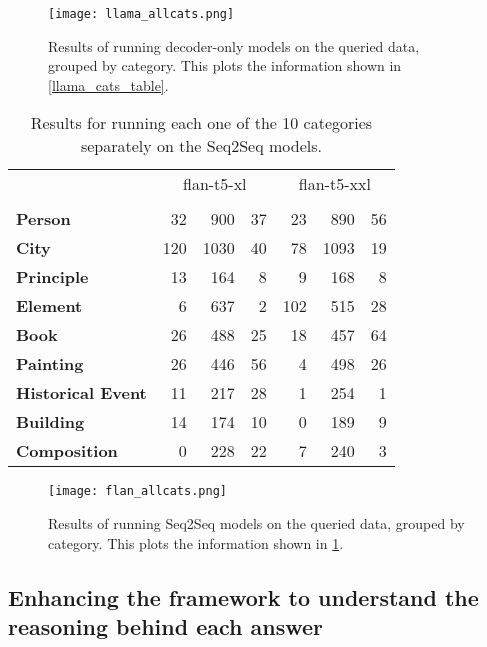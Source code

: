 \begin{figure}[p]
	\centering
	\texttt{[image: llama\_allcats.png]}
	\caption{Results of running decoder-only models on the queried data, grouped by category. This plots the information shown in \cref{llama_cats_table}.}
	\label{llama_cats_result}
\end{figure}

\begin{table}[ht]
	\centering
	\footnotesize
	\begin{tabular}{>{\bfseries}l | r r r | r r r}
		\toprule
			& \multicolumn{3}{|c}{\ttfamily flan-t5-xl} & \multicolumn{3}{|c}{\ttfamily flan-t5-xxl} \\
			& \Parametric{} & \Contextual{} & \Other{} & \Parametric{} & \Contextual{} & \Other{} \\
		\midrule
			Person           &  32 &  900 & 37 &  23 &  890 & 56 \\
			City             & 120 & 1030 & 40 &  78 & 1093 & 19 \\
			Principle        &  13 &  164 &  8 &   9 &  168 &  8 \\
			Element          &   6 &  637 &  2 & 102 &  515 & 28 \\
			Book             &  26 &  488 & 25 &  18 &  457 & 64 \\
			Painting         &  26 &  446 & 56 &   4 &  498 & 26 \\
			Historical Event &  11 &  217 & 28 &   1 &  254 &  1 \\
			Building         &  14 &  174 & 10 &   0 &  189 &  9 \\
			Composition      &   0 &  228 & 22 &   7 &  240 &  3 \\
		\bottomrule
	\end{tabular}
	\caption{Results for running each one of the 10 categories separately on the Seq2Seq models.}
	\label{flan_cats_table}
\end{table}

\begin{figure}[p]
	\centering
	\texttt{[image: flan\_allcats.png]}
	\caption{Results of running Seq2Seq models on the queried data, grouped by category. This plots the information shown in \cref{flan_cats_table}.}
	\label{flan_cats_result}
\end{figure}


\subsection{Enhancing the framework to understand the reasoning behind each answer}
\label{results_perplexity_score}

